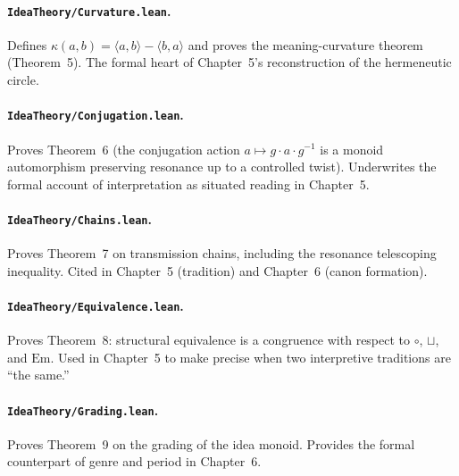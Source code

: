\documentclass[11pt,oneside]{book}
\begin{document}
\paragraph{\texttt{IdeaTheory/Curvature.lean}.}
Defines $\kappa(a,b)=\langle a,b\rangle-\langle b,a\rangle$ and
proves the meaning-curvature theorem (Theorem~5). The formal heart
of Chapter~5's reconstruction of the hermeneutic circle.

\paragraph{\texttt{IdeaTheory/Conjugation.lean}.}
Proves Theorem~6 (the conjugation action $a\mapsto g\cdot a\cdot
g^{-1}$ is a monoid automorphism preserving resonance up to a
controlled twist). Underwrites the formal account of interpretation
as situated reading in Chapter~5.

\paragraph{\texttt{IdeaTheory/Chains.lean}.}
Proves Theorem~7 on transmission chains, including the resonance
telescoping inequality. Cited in Chapter~5 (tradition) and
Chapter~6 (canon formation).

\paragraph{\texttt{IdeaTheory/Equivalence.lean}.}
Proves Theorem~8: structural equivalence is a congruence with
respect to $\circ$, $\sqcup$, and $\mathrm{Em}$. Used in Chapter~5
to make precise when two interpretive traditions are ``the same.''

\paragraph{\texttt{IdeaTheory/Grading.lean}.}
Proves Theorem~9 on the grading of the idea monoid. Provides the
formal counterpart of genre and period in Chapter~6.

\backmatter


\end{document}
